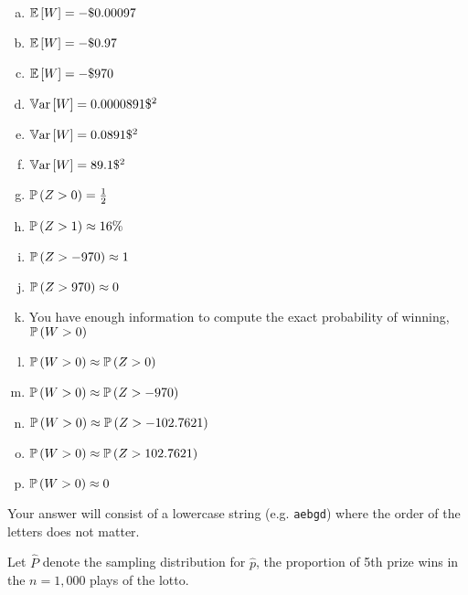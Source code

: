\documentclass[12pt,landscape]{article}
\newcommand{\instr}{\small Your answer will consist of a lowercase string (e.g. \texttt{aebgd}) where the order of the letters does not matter. \normalsize}
\begin{document}
\vspace{-0.2cm}\benum{} 
\begin{enumerate}[(a)]
\item $\mathbb{E}\left[W\right] = -\$0.00097$
\item $\mathbb{E}\left[W\right] = -\$0.97$
\item $\mathbb{E}\left[W\right] = -\$970$
\item $\mathbb{V}\text{ar}\left[W\right] = 0.0000891\$^2$
\item $\mathbb{V}\text{ar}\left[W\right] = 0.0891\$^2$
\item $\mathbb{V}\text{ar}\left[W\right] = 89.1\$^2$

\item $\mathbb{P}\left(Z > 0\right) = \frac{1}{2}$
\item $\mathbb{P}\left(Z > 1\right) \approx 16\%$
\item $\mathbb{P}\left(Z > -970\right) \approx 1$
\item $\mathbb{P}\left(Z > 970\right) \approx 0$

\item You have enough information to compute the exact probability of winning, $\mathbb{P}\left(W > 0\right)$
\item $\mathbb{P}\left(W > 0\right) \approx \mathbb{P}\left(Z > 0\right)$ 
\item $\mathbb{P}\left(W > 0\right) \approx \mathbb{P}\left(Z > -970\right)$ 
\item $\mathbb{P}\left(W > 0\right) \approx \mathbb{P}\left(Z > -102.7621\right)$ 
\item $\mathbb{P}\left(W > 0\right) \approx \mathbb{P}\left(Z > 102.7621\right)$ 
\item $\mathbb{P}\left(W > 0\right) \approx 0$
\end{enumerate}
\eenum\instr\pagebreak



\problem{}  Let $\hat{P}$ denote the sampling distribution for $\hat{p}$, the proportion of 5th prize wins in the $n=1,000$ plays of the lotto.
\end{document}
